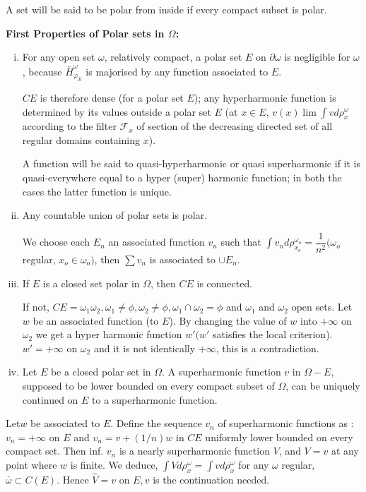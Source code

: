  A set will be said to be polar from inside if every compact subset is polar.

\medskip
  \noindent
  \textbf{First Properties of Polar sets in $\Omega$:}\pageoriginale
  
  \begin{enumerate} [(i)]
  \item For any open set $\omega$, relatively compact, a polar set $E$
    on $\partial \omega$ is negligible for $\omega$, because
    $\bar{H}^\omega_{\varphi_E}$ is majorised by any function
    associated to $E$. 

    $CE$ is therefore dense (for a polar set $E$); any hyperharmonic
    function is determined by its values outside a polar set $E$ (at
    $x \in E$, $v(x) \lim \int vd \rho^\omega_x $ according to the
    filter $\mathscr{F}_x$ of section of the decreasing directed set
    of all regular domains containing $x$).  
     
    A function will be said to quasi-hyperharmonic or quasi
    superharmonic if it is quasi-everywhere equal to a hyper
    (\resp super) harmonic function; in both the cases the latter
    function is unique. 
  \item Any countable union of polar sets is polar.

    We choose each $E_n$ an associated function $v_n$ such that $\int
    v_n d \rho^{\omega_o}_{x_o} = \dfrac{1}{n^2} (\omega_o$ regular,
    $x_o \in \omega_o)$, then $\sum v_n$ is associated to $\cup E_n$. 
  \item If $E$ is a closed set polar in $\Omega$, then $CE$ is
    connected. 
    
    If not, $CE = \omega_1 \omega_2,  \omega_1 \neq \phi,  \omega_2
    \neq \phi, \omega_1 \cap \omega_2 = \phi$ and $\omega_1$ and
    $\omega_2$ open sets. Let $w$ be an associated function (to
    $E$). By changing the value of $w$ into $+ \infty$ on $\omega_2$
    we get a hyper harmonic function $w' (w'$ satisfies the local
    criterion). $w' = + \infty$ on $\omega_2$ and it is not
    identically $+  \infty$, this is a contradiction. 
  \item Let $E$ be a closed polar set in $\Omega$. A superharmonic
    function $v$ in $\Omega - E$, supposed to be lower bounded on
    every compact subset of $\Omega$, can be uniquely continued on $E$
    to a superharmonic function. 
  \end{enumerate}

Let\pageoriginale $w$ be associated to $E$. Define the sequence $v_n$ of
superharmonic functions as : $v_n = + \infty$ on $E$ and $v_n = v +
(1/n) w$ in $CE$ uniformly lower bounded on every compact set. Then
inf. $v_n$ is a nearly superharmonic function $V$, and $V = v $ at any
point where $w$ is finite. We deduce, $\int V d \rho ^\omega_x = \int
v d\rho^\omega_x$ for any $\omega$ regular, $\bar{\omega} \subset
C(E)$. Hence $\hat{V} = v $ on $E, v$ is the continuation needed. 

